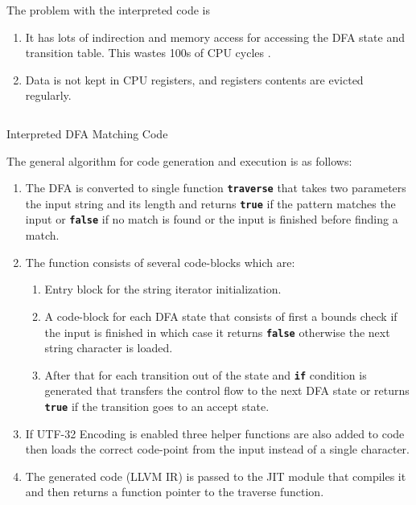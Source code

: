The problem with the interpreted code is
\begin{enumerate}
    \item It has lots of indirection and memory access for accessing the DFA state and transition table. This wastes 100s of CPU cycles \cite{cpumemgap}.
    \item Data is not kept in CPU registers, and registers contents are evicted regularly.
\end{enumerate}

\begin{listing}[htbp]
\inputminted[breaklines=true,frame=lines,linenos]{cpp}{code/interpretted.cpp}
\caption[Interpreted DFA Code]{Interpreted DFA Matching Code}
\label{lst:dfainterpreted}
\end{listing}

The general algorithm for code generation and execution is as follows:
\begin{enumerate}
    \item The DFA is converted to single function \texttt{\textbf{traverse}} that takes two parameters the input string and its length and returns \texttt{\textbf{true}} if the pattern matches the input or \texttt{\textbf{false}} if no match is found or the input is finished before finding a match.
    \item The function consists of several code-blocks which are:
    \begin{enumerate}
        \item Entry block for the string iterator initialization.
        \item A code-block for each DFA state that consists of first a bounds check if the input is finished in which case it returns \texttt{\textbf{false}} otherwise the next string character is loaded.
        \item After that for each transition out of the state and \texttt{\textbf{if}} condition is generated that transfers the control flow to the next DFA state or returns \texttt{\textbf{true}} if the transition goes to an accept state.
    \end{enumerate}
    \item If UTF-32 Encoding is enabled three helper functions are also added to code then loads the correct code-point from the input instead of a single character.
    \item The generated code (LLVM IR) is passed to the JIT module that compiles it and then returns a function pointer to the traverse function. 
    
\end{enumerate}

